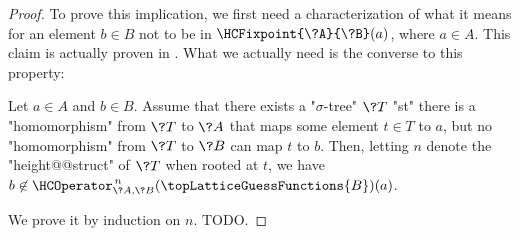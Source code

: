\begin{proof}
	To prove this implication, we first need a characterization of
	what it means for an element $b\in B$ not to be in $\HCFixpoint{\?A}{\?B}(a)$,
	where $a\in A$.
	This claim is actually proven in \cite[Proof of Lemma 3.2]{LaroseLotenTardif2007CharacterisationFOCSP}. 
	What we actually need is the converse to this property:
	\begin{claim}
		\AP\label{claim:hyperedge-consistency-uniform-convergence-tree-witnesses}
		Let $a\in A$ and $b\in B$. Assume that there exists a "$\sigma$-tree" $\?T$ "st" there is a "homomorphism" from $\?T$ to $\?A$ that maps some element $t \in T$ to $a$, but no "homomorphism" from $\?T$ to $\?B$
		can map $t$ to $b$. Then, letting $n$ denote the "height@@struct" of $\?T$ when rooted
		at $t$, we have $b \not\in \HCOperator^{\,n}_{\?A,\?B}(\topLatticeGuessFunctions{B})(a)$.
	\end{claim}
	We prove it by induction on $n$. TODO.


\end{proof}
